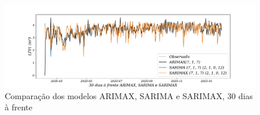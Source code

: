 \begin{figure}[!t]
	\centering
	\caption{Comparação dos modelos ARIMAX, SARIMA e SARIMAX, 30 dias à frente }
	\label{fig:60-ARIMAX-SARIMA-SARIMAX24}
	\includegraphics[width=1\linewidth]{Apendices/Figuras/modelagem-24h/30-ARIMAX-SARIMA-SARIMAX}
	
\end{figure}